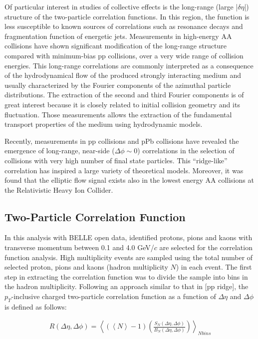 \documentclass[%
preprint,
 amsmath,amssymb,
 aps,
]{revtex4-1}
\begin{document}
Of particular interest in studies of collective effects is the long-range (large |$\delta\eta$|) structure of the two-particle correlation functions. In this region, the function is less susceptible to known sources of correlations such as resonance decays and fragmentation function of energetic jets. Measurements in high-energy AA collisions have shown significant modification of the long-range structure compared with minimum-bias pp collisions, over a very wide range of collision energies. This long-range correlations are commonly interpreted as a consequence of the hydrodynamical flow of the produced strongly interacting medium and usually characterized by the Fourier components of the azimuthal particle distributions. The extraction of the second and third Fourier components is of great interest because it is closely related to initial collision geometry and its fluctuation. Those measurements allows the extraction of the fundamental transport properties of the medium using hydrodynamic models.

Recently, measurements in pp collisions and pPb collisions have revealed the emergence of long-range, near-side ($\Delta\phi\sim 0$) correlations in the selection of collisions with very high number of final state particles. This ``ridge-like'' correlation has inspired a large variety of theoretical models. Moreover, it was found that the elliptic flow signal exists also in the lowest energy AA collisions at the Relativistic Heavy Ion Collider. 

\subsection{Two-Particle Correlation Function}

In this analysis with BELLE open data, identified protons, pions and kaons with transverse momentum between 0.1 and 4.0 GeV/$c$ are selected for the correlation function analysis. High multiplicity events are sampled using the total number of selected proton, pions and kaons (hadron multiplicity $N$) in each event. The first step in extracting the correlation function was to divide the sample into bins in the hadron multiplicity. Following an approach similar to that in [pp ridge], the $p_{T}$-inclusive charged two-particle correlation function as a function of $\Delta\eta$ and $\Delta\phi$ is defined as follows:

\begin{eqnarray}
\label{eq:R}
R(\Delta\eta,\Delta\phi) = \left<(\left<N\right>-1)\left(\frac{S_N(\Delta\eta,\Delta\phi)}{B_N(\Delta\eta,\Delta\phi)}\right)\right>_{N bins}
\end{eqnarray}
\end{document}
